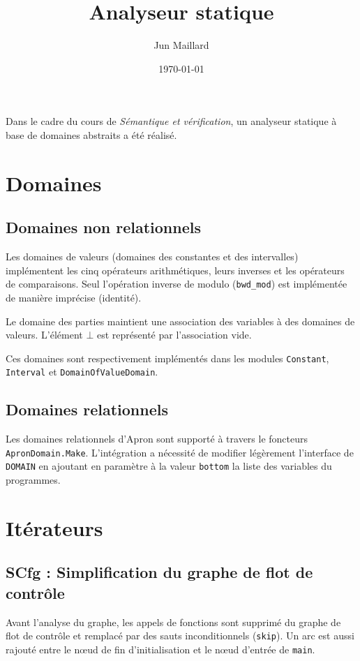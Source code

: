 \documentclass{article}
\author{Jun Maillard}
\title{Analyseur statique}
\date{\today}
\begin{document}
\lstset{language=C}

\maketitle

Dans le cadre du cours de \textit{Sémantique et vérification}, un
analyseur statique à base de domaines abstraits a été réalisé.

\section{Domaines}
\subsection{Domaines non relationnels} 

Les domaines de valeurs (domaines des constantes et des intervalles)
implémentent les cinq opérateurs arithmétiques, leurs inverses et les
opérateurs de comparaisons. Seul l'opération inverse de modulo
(\verb|bwd_mod|) est implémentée de manière
imprécise (identité). 

Le domaine des parties maintient une association des variables à des
domaines de valeurs. L'élément $\bot$ est représenté par l'association
vide.

Ces domaines sont respectivement implémentés dans les modules
\verb|Constant|, \verb|Interval| et \verb|DomainOfValueDomain|.

\subsection{Domaines relationnels} 

Les domaines relationnels d'Apron sont supporté à travers le foncteurs
\verb|ApronDomain.Make|. L'intégration a nécessité de modifier
légèrement l'interface de \verb|DOMAIN| en ajoutant en paramètre à la
valeur \verb|bottom| la liste des variables du programmes.

\section{Itérateurs}
\subsection{SCfg : Simplification du graphe de flot de contrôle}

Avant l'analyse du graphe, les appels de fonctions sont supprimé du
graphe de flot de contrôle et remplacé par des sauts inconditionnels (\verb|skip|).
Un arc est aussi rajouté entre le n\oe{}ud de fin d'initialisation et le
n\oe{}ud d'entrée de \verb|main|.
\end{document}
